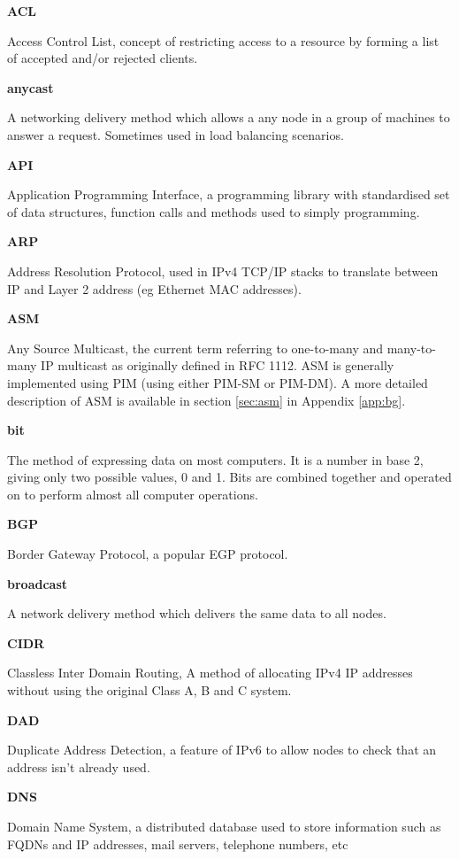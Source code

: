 \textbf{ACL}

Access Control List, concept of restricting access to a resource by
forming a list of accepted and/or rejected clients.

\textbf{anycast}

A networking delivery method which allows a any node in a group of 
machines to answer a request. Sometimes used in load balancing 
scenarios.

\textbf{API}

Application Programming Interface, a programming library with
standardised set of data structures, function calls and methods used to
simply programming.

\textbf{ARP}

Address Resolution Protocol, used in IPv4 TCP/IP stacks to translate 
between IP and Layer 2 address (eg Ethernet MAC addresses).

\textbf{ASM}

Any Source Multicast, the current term referring to one-to-many and
many-to-many IP multicast as originally defined in RFC 1112. ASM is 
generally implemented using PIM (using either PIM-SM or PIM-DM). A more 
detailed description of ASM is available in section \ref{sec:asm} in 
Appendix \ref{app:bg}.

\textbf{bit}

The method of expressing data on most computers. It is a number in base
2, giving only two possible values, 0 and 1. Bits are combined together
and operated on to perform almost all computer operations.

\textbf{BGP}

Border Gateway Protocol, a popular EGP protocol.  

\textbf{broadcast}

A network delivery method which delivers the same data to all nodes.

\textbf{CIDR}

Classless Inter Domain Routing, A method of allocating IPv4 IP addresses
without using the original Class A, B and C system.

\textbf{DAD}

Duplicate Address Detection, a feature of IPv6 to allow nodes to check
that an address isn't already used.

\textbf{DNS}

Domain Name System, a distributed database used to store information
such as FQDNs and IP addresses, mail servers, telephone numbers, etc

